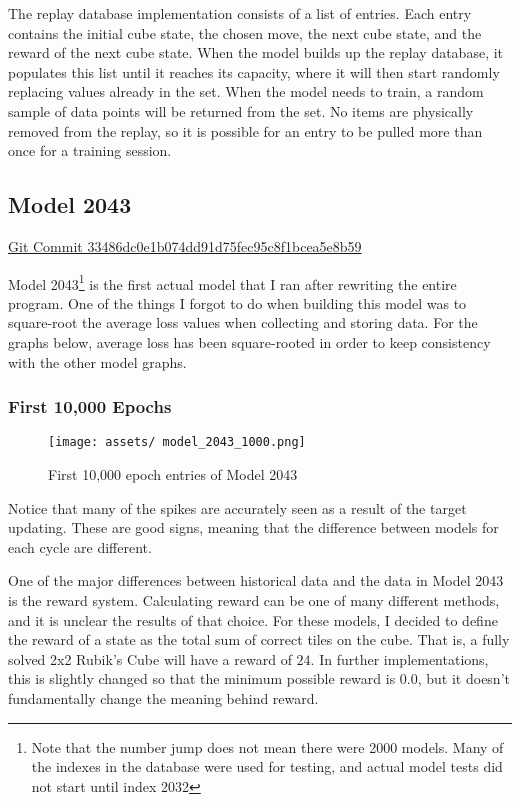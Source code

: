\documentclass[12pt]{article}
\begin{document}
The replay database implementation consists of a list of entries. Each entry contains the initial cube state, the chosen move, the next cube state, and the reward of the next cube state. When the model builds up the replay database, it populates this list until it reaches its capacity, where it will then start randomly replacing values already in the set. When the model needs to train, a random sample of data points will be returned from the set. No items are physically removed from the replay, so it is possible for an entry to be pulled more than once for a training session.

\newpage

\subsection{Model 2043}

\href{https://www.github.com/LittleTealeaf/mlcube/tree/33486dc0e1b074dd91d75fec95c8f1bcea5e8b59}{Git Commit 33486dc0e1b074dd91d75fec95c8f1bcea5e8b59}


Model 2043\footnote{Note that the number jump does not mean there were 2000 models. Many of the indexes in the database were used for testing, and actual model tests did not start until index 2032} is the first actual model that I ran after rewriting the entire program. One of the things I forgot to do when building this model was to square-root the average loss values when collecting and storing data. For the graphs below, average loss has been square-rooted in order to keep consistency with the other model graphs.

\subsubsection{First 10,000 Epochs}

\begin{figure}[h]
	\centering
	\texttt{[image: assets/ model\_2043\_1000.png]}
	\caption{First 10,000 epoch entries of Model 2043}
\end{figure}

Notice that many of the spikes are accurately seen as a result of the target updating. These are good signs, meaning that the difference between models for each cycle are different.

One of the major differences between historical data and the data in Model 2043 is the reward system. Calculating reward can be one of many different methods, and it is unclear the results of that choice. For these models, I decided to define the reward of a state as the total sum of correct tiles on the cube. That is, a fully solved 2x2 Rubik's Cube will have a reward of $24$. In further implementations, this is slightly changed so that the minimum possible reward is $0.0$, but it doesn't fundamentally change the meaning behind reward.
\end{document}
